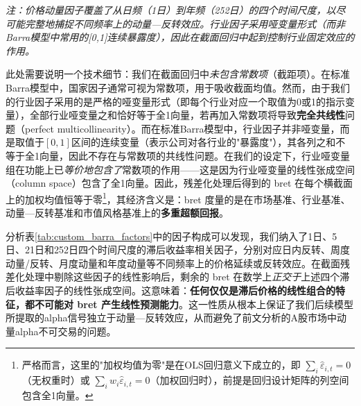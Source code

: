 \documentclass{article}
\begin{document}
\begin{table}[htbp]
    \centering
    \caption{用于预测目标残差化处理的自定义风格因子列表}
    \label{tab:custom_barra_factors}
    \vspace{0.5em}
    \begin{minipage}{0.95\textwidth}
        \footnotesize\textit{注：价格动量因子覆盖了从日频（1日）到年频（252日）的四个时间尺度，以尽可能完整地捕捉不同频率上的动量—反转效应。行业因子采用哑变量形式（而非Barra模型中常用的[0,1]连续暴露度），因此在截面回归中起到控制行业固定效应的作用。}
    \end{minipage}
\end{table}

此处需要说明一个技术细节：我们在截面回归中\textit{未包含常数项}（截距项）。在标准Barra模型中，国家因子通常可视为常数项，用于吸收截面均值。然而，由于我们的行业因子采用的是严格的哑变量形式（即每个行业对应一个取值为0或1的指示变量），全部行业哑变量之和恰好等于全1向量，若再加入常数项将导致\textbf{完全共线性}问题（perfect multicollinearity）。而在标准Barra模型中，行业因子并非哑变量，而是取值于$[0,1]$区间的连续变量（表示公司对各行业的"暴露度"），其各列之和不等于全1向量，因此不存在与常数项的共线性问题。在我们的设定下，行业哑变量组在功能上已\textit{等价地包含了}常数项的作用——这是因为行业哑变量的线性张成空间（column space）包含了全1向量。因此，残差化处理后得到的 bret 在每个横截面上的加权均值恒等于零\footnote{严格而言，这里的"加权均值为零"是在OLS回归意义下成立的，即 $\sum_{i} \hat{\varepsilon}_{i,t} = 0$（无权重时）或 $\sum_{i} w_i \hat{\varepsilon}_{i,t} = 0$（加权回归时），前提是回归设计矩阵的列空间包含全1向量。}，其经济含义是：bret 度量的是在市场基准、行业基准、动量—反转基准和市值风格基准上的\textbf{多重超额回报}。

分析表\ref{tab:custom_barra_factors}中的因子构成可以发现，我们纳入了1日、5日、21日和252日四个时间尺度的滞后收益率相关因子，分别对应日内反转、周度动量/反转、月度动量和年度动量等不同频率上的价格延续或反转效应。在截面残差化处理中剔除这些因子的线性影响后，剩余的 bret 在数学上\textit{正交于}上述四个滞后收益率因子的线性张成空间。这意味着：\textbf{任何仅仅是滞后价格的线性组合的特征，都不可能对 bret 产生线性预测能力}。这一性质从根本上保证了我们后续模型所提取的alpha信号独立于动量—反转效应，从而避免了前文分析的A股市场中动量alpha不可交易的问题。
\end{document}
